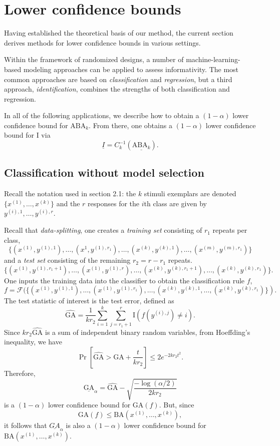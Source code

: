 \documentclass[12pt]{article}
\begin{document}
\section{Lower confidence bounds}

Having established the theoretical basis of our method, the current
section derives methods for lower confidence bounds in various
settings.

Within the framework of randomized designs, a number of
machine-learning-based modeling approaches can be applied to assess
informativity.  The most common approaches are based
on \emph{classification} and \emph{regression}, but a third
approach, \emph{identification}, combines the strengths of both
classification and regression.

In all of the following applications, we describe how to obtain a
$(1-\alpha)$ lower confidence bound for $\text{ABA}_k$.  From there,
one obtains a $(1-\alpha)$ lower confidence bound for $\text{I}$ via
\[
\underline{I} = C_k^{-1}(\underline{\text{ABA}_k}).
\]

\subsection{Classification without model selection}

Recall the notation used in section 2.1: the $k$ stimuli exemplars are
denoted $\{x^{(1)},\hdots, x^{(k)}\}$ and the $r$ responses for the
$i$th class are given by $y^{(i), 1},\hdots, y^{(i), r}$.

Recall that \emph{data-splitting}, one creates a \emph{training
set} consisting of $r_1$ repeats per class,
\[
\{(x^{(1)}, y^{(1),1}),\hdots, (x^1,y^{(1), r_1}), \hdots, (x^{(k)}, y^{(k),1}),\hdots, (x^{(m)},y^{(m), r_1})\}
\]
and a \emph{test set} consisting of the remaining $r_2 = r - r_1$ repeats.
\[
\{(x^{(1)}, y^{(1), r_1 + 1}),\hdots, (x^{(1)},y^{(1),r}), \hdots, (x^{(k)}, y^{(k), r_1 + 1}),\hdots, (x^{(k)},y^{(k),r_1})\}.
\]
One inputs the training data into the classifier to obtain the classification rule $f$,
\[
f = \mathcal{F}(\{(x^{(1)}, y^{(1),1}),\hdots, (x^{(1)},y^{(1),r_1}), \hdots, (x^{(k)}, y^{(k),1},\hdots, (x^{(k)},y^{(k), r_1})\}).
\]
The test statistic of interest is the test error,
defined as
\[
\widehat{\text{GA}} = \frac{1}{k r_2} \sum_{i=1}^k \sum_{j = r_1 + 1}^r \text{I}(f(y^{(i),j}) \neq i).
\]
Since $kr_2 \widehat{\text{GA}}$ is a sum of independent binary random
variables, from Hoeffding's inequality, we have
\[
\Pr[\widehat{\text{GA}} > \text{GA} + \frac{t}{kr_2}] \leq 2e^{-2kr_2t^2}.
\]
Therefore,
\[
\underline{\text{GA}}_\alpha = \widehat{\text{GA}} - \sqrt{\frac{-\log(\alpha/2)}{2kr_2}}
\]
is a $(1-\alpha)$ lower confidence bound for $\text{GA}(f)$.
But, since
\[
\text{GA}(f) \leq \text{BA}(x^{(1)},\hdots, x^{(k)}),
\]
it follows that $\underline{GA}_\alpha$ is also a $(1-\alpha)$ lower confidence bound for $\text{BA}(x^{(1)},\hdots, x^{(k)})$.
\end{document}
